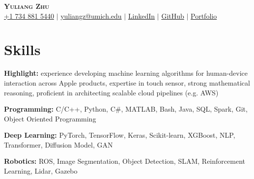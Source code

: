 \documentclass[letterpaper,11pt]{article}
\newcommand{\resumeSubHeadingListStart}{\begin{itemize}[leftmargin=0.15in, label={}]}
\newcommand{\resumeSubHeadingListEnd}{\end{itemize}}
\begin{document}

\begin{center}
    \textbf{\Huge \scshape Yuliang Zhu} \\ \vspace{1pt}
    \small
    \faMobile \hspace{.5pt} \href{tel:1734885440}{+1 734 881 5440}
    $|$
    \faAt \hspace{.5pt} \href{mailto:yuliangz@umich.edu}{yuliangz@umich.edu}
    $|$
    \faLinkedinSquare \hspace{.5pt} \href{https://www.linkedin.com/in/yuliang-zhu-34005315b}{LinkedIn}
    $|$
    \faGithub \hspace{.5pt} \href{https://github.com/angrypiggy}{GitHub}
    $|$
    \faGlobe \hspace{.5pt} \href{https://angrypiggy.github.io/yuliangz/}{Portfolio}
\end{center}


\vspace*{-15pt}
\section{Skills}
  \vspace{1pt}
  \resumeSubHeadingListStart
    \small{\item{
        \textbf{Highlight:}{ experience developing machine learning algorithms for human-device interaction across Apple products, expertise in touch sensor, strong mathematical reasoning, proficient in architecting scalable cloud pipelines (e.g. AWS)} \\ \vspace{3pt}

        \textbf{Programming:}{ C/C++, Python, C\#, MATLAB, Bash, Java, SQL, Spark, Git, Object Oriented Programming} \\ \vspace{3pt}
        
        \textbf{Deep Learning:}{ PyTorch, TensorFlow, Keras, Scikit-learn, XGBoost, NLP, Transformer, Diffusion Model, GAN} \\ \vspace{3pt}
        
        \textbf{Robotics:}{ ROS, Image Segmentation, Object Detection, SLAM, Reinforcement Learning, Lidar, Gazebo} \\ \vspace{3pt}

        
        
    }}
  \resumeSubHeadingListEnd
\end{document}
